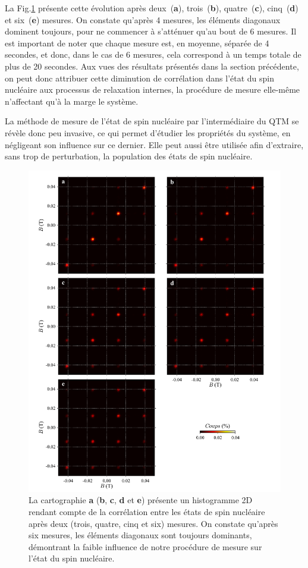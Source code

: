 La Fig.\ref{evolution_mesures} présente cette évolution après deux~(\textbf{a}), trois~(\textbf{b}), quatre~(\textbf{c}), cinq~(\textbf{d}) et six~(\textbf{e}) mesures. On constate qu'après 4 mesures, les éléments diagonaux dominent toujours, pour ne commencer à s'atténuer qu'au bout de 6 mesures. Il est important de noter que chaque mesure est, en moyenne, séparée de 4 secondes, et donc, dans le cas de 6 mesures, cela correspond à un temps totale de plus de 20 secondes. Aux vues des résultats présentés dans la section précédente, on peut donc attribuer cette diminution de corrélation dans l'état du spin nucléaire aux processus de relaxation internes, la procédure de mesure elle-même n'affectant qu'à la marge le système. 

La méthode de mesure de l'état de spin nucléaire par l'intermédiaire du QTM se révèle donc peu invasive, ce qui permet d'étudier les propriétés du système, en négligeant son influence sur ce dernier. Elle peut aussi être utilisée afin d'extraire, sans trop de perturbation, la population des états de spin nucléaire.

\begin{figure}
\includegraphics[scale=0.45]{Resultats/MesureInfl/MesureInfl.pdf} 
\caption{La cartographie \textbf{a} (\textbf{b}, \textbf{c}, \textbf{d} et \textbf{e}) présente un histogramme 2D rendant compte de la corrélation entre les états de spin nucléaire après deux (trois, quatre, cinq et six) mesures. On constate qu'après six mesures, les éléments diagonaux sont toujours dominants, démontrant la faible influence de notre procédure de mesure sur l'état du spin nucléaire.}
\label{evolution_mesures}
\end{figure}

